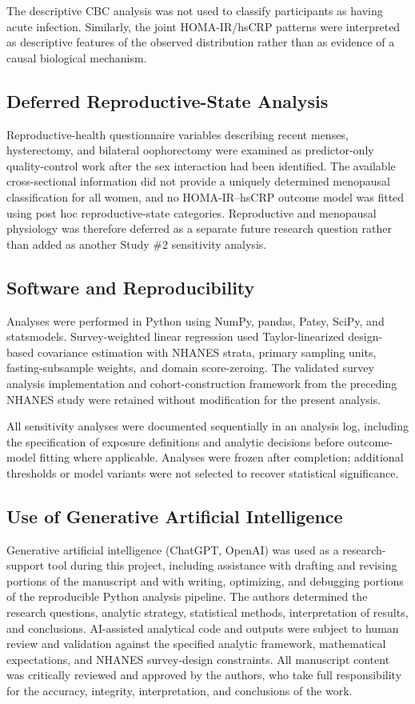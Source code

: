 \documentclass[11pt]{article}
\begin{document}
The descriptive CBC analysis was not used to classify participants as having
acute infection. Similarly, the joint HOMA-IR/hsCRP patterns were interpreted
as descriptive features of the observed distribution rather than as evidence
of a causal biological mechanism.

\subsection{Deferred Reproductive-State Analysis}

Reproductive-health questionnaire variables describing recent menses,
hysterectomy, and bilateral oophorectomy were examined as predictor-only
quality-control work after the sex interaction had been identified. The
available cross-sectional information did not provide a uniquely determined
menopausal classification for all women, and no HOMA-IR--hsCRP outcome model
was fitted using post hoc reproductive-state categories. Reproductive and
menopausal physiology was therefore deferred as a separate future research
question rather than added as another Study \#2 sensitivity analysis.

\subsection{Software and Reproducibility}

Analyses were performed in Python using NumPy, pandas, Patsy, SciPy, and
statsmodels. Survey-weighted linear regression used Taylor-linearized
design-based covariance estimation with NHANES strata, primary sampling units,
fasting-subsample weights, and domain score-zeroing. The validated survey
analysis implementation and cohort-construction framework from the preceding
NHANES study were retained without modification for the present analysis.

All sensitivity analyses were documented sequentially in an analysis log,
including the specification of exposure definitions and analytic decisions
before outcome-model fitting where applicable. Analyses were frozen after
completion; additional thresholds or model variants were not selected to
recover statistical significance.

\subsection{Use of Generative Artificial Intelligence}

Generative artificial intelligence (ChatGPT, OpenAI) was used as a
research-support tool during this project, including assistance with drafting
and revising portions of the manuscript and with writing, optimizing, and
debugging portions of the reproducible Python analysis pipeline. The authors
determined the research questions, analytic strategy, statistical methods,
interpretation of results, and conclusions. AI-assisted analytical code and
outputs were subject to human review and validation against the specified
analytic framework, mathematical expectations, and NHANES survey-design
constraints. All manuscript content was critically reviewed and approved by
the authors, who take full responsibility for the accuracy, integrity,
interpretation, and conclusions of the work.
\end{document}
